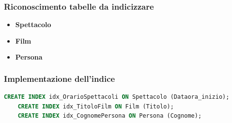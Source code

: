\documentclass[10pt]{article}
\begin{document}
	\subsubsection{Riconoscimento tabelle da indicizzare}
	\begin{itemize}
		\item \textbf{Spettacolo}
		\item \textbf{Film}
		\item \textbf{Persona}
	\end{itemize}
	\subsubsection{Implementazione dell'indice}
	\begin{lstlisting}[language=SQL]
	CREATE INDEX idx_OrarioSpettacoli ON Spettacolo (Dataora_inizio);
	CREATE INDEX idx_TitoloFilm ON Film (Titolo);
	CREATE INDEX idx_CognomePersona ON Persona (Cognome);
	
	\end{lstlisting}
\end{document}
